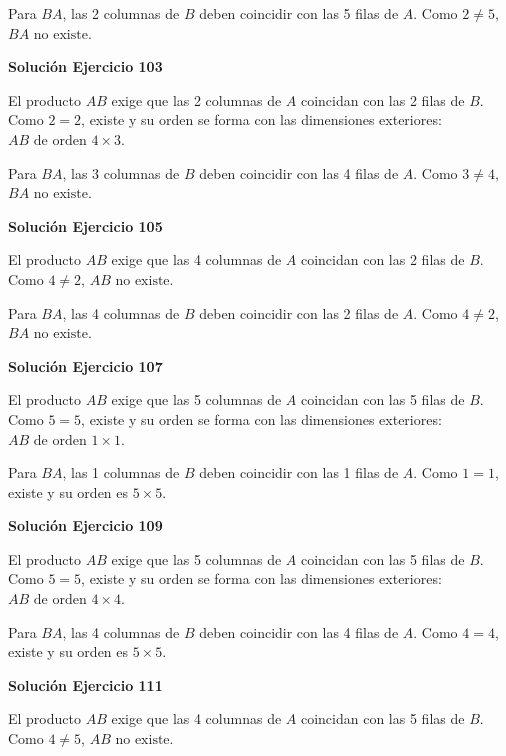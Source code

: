 \documentclass[12pt]{article}
\begin{document}
Para $BA$, las 2 columnas de $B$ deben coincidir con las 5 filas de $A$. Como $2\neq5$, $\boxed{BA\text{ no existe}}$.


\par\bigskip\noindent\textbf{Solución Ejercicio 103}\par\nobreak
El producto $AB$ exige que las 2 columnas de $A$ coincidan con las 2 filas de $B$. Como $2=2$, existe y su orden se forma con las dimensiones exteriores: $\boxed{AB\text{ de orden } 4\times 3}$.

Para $BA$, las 3 columnas de $B$ deben coincidir con las 4 filas de $A$. Como $3\neq4$, $\boxed{BA\text{ no existe}}$.


\par\bigskip\noindent\textbf{Solución Ejercicio 105}\par\nobreak
El producto $AB$ exige que las 4 columnas de $A$ coincidan con las 2 filas de $B$. Como $4\neq2$, $\boxed{AB\text{ no existe}}$.

Para $BA$, las 4 columnas de $B$ deben coincidir con las 2 filas de $A$. Como $4\neq2$, $\boxed{BA\text{ no existe}}$.


\par\bigskip\noindent\textbf{Solución Ejercicio 107}\par\nobreak
El producto $AB$ exige que las 5 columnas de $A$ coincidan con las 5 filas de $B$. Como $5=5$, existe y su orden se forma con las dimensiones exteriores: $\boxed{AB\text{ de orden } 1\times 1}$.

Para $BA$, las 1 columnas de $B$ deben coincidir con las 1 filas de $A$. Como $1=1$, existe y su orden es $\boxed{5\times 5}$.


\par\bigskip\noindent\textbf{Solución Ejercicio 109}\par\nobreak
El producto $AB$ exige que las 5 columnas de $A$ coincidan con las 5 filas de $B$. Como $5=5$, existe y su orden se forma con las dimensiones exteriores: $\boxed{AB\text{ de orden } 4\times 4}$.

Para $BA$, las 4 columnas de $B$ deben coincidir con las 4 filas de $A$. Como $4=4$, existe y su orden es $\boxed{5\times 5}$.


\par\bigskip\noindent\textbf{Solución Ejercicio 111}\par\nobreak
El producto $AB$ exige que las 4 columnas de $A$ coincidan con las 5 filas de $B$. Como $4\neq5$, $\boxed{AB\text{ no existe}}$.
\end{document}
